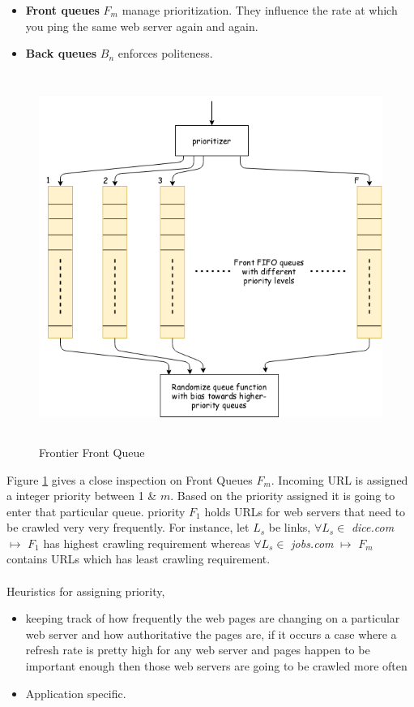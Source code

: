 \begin{itemize}
\item \textbf{Front queues} $F_m$ manage prioritization. They influence the rate at which you ping the
  same web server again and again.
  \item \textbf{Back queues} $B_n$ enforces politeness.
\end{itemize}

\pagebreak

\begin{figure}[h!]
  \centering
  \includegraphics[width=14cm,height=12cm,keepaspectratio]{../media/crawler/f-queue.png}
  \caption{Frontier Front Queue \cite{mercator}}
  \label{fig:fqueue}
\end{figure}

\noindent
Figure \ref{fig:fqueue} gives a close inspection on Front Queues $F_m$. Incoming URL is assigned a integer  priority between 1 \& $m$. Based on the priority assigned it is going to enter that particular queue.
priority $F_1$ holds URLs for web servers that need to be crawled very very frequently. For instance,
let $L_s$ be links, $\forall L_s \in $ \textit{dice.com} $ \longmapsto $ $F_1$ has highest crawling requirement whereas $\forall L_s \in $ \textit{jobs.com} $ \longmapsto $ $F_m$ contains URLs which has least
crawling requirement. 
\\
\\
Heuristics for assigning priority,
\begin{itemize}
\item keeping track of how frequently the web pages are changing on a particular web server and how authoritative the pages are, if it occurs a case where a refresh rate is pretty high for any web server and pages happen to be important enough then those web servers are going to be crawled more often
\item Application specific. 
\end{itemize}

